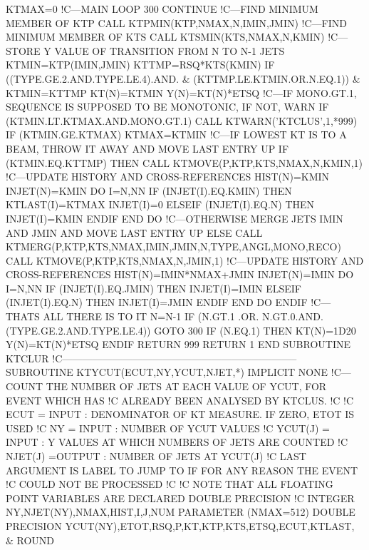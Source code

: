     KTMAX=0
!C---MAIN LOOP
300 CONTINUE
!C---FIND MINIMUM MEMBER OF KTP
    CALL KTPMIN(KTP,NMAX,N,IMIN,JMIN)
!C---FIND MINIMUM MEMBER OF KTS
    CALL KTSMIN(KTS,NMAX,N,KMIN)
!C---STORE Y VALUE OF TRANSITION FROM N TO N-1 JETS
    KTMIN=KTP(IMIN,JMIN)
    KTTMP=RSQ*KTS(KMIN)
    IF ((TYPE.GE.2.AND.TYPE.LE.4).AND. &
         (KTTMP.LE.KTMIN.OR.N.EQ.1)) &
         KTMIN=KTTMP
    KT(N)=KTMIN
    Y(N)=KT(N)*ETSQ
!C---IF MONO.GT.1, SEQUENCE IS SUPPOSED TO BE MONOTONIC, IF NOT, WARN
    IF (KTMIN.LT.KTMAX.AND.MONO.GT.1) CALL KTWARN('KTCLUS',1,*999)
    IF (KTMIN.GE.KTMAX) KTMAX=KTMIN
!C---IF LOWEST KT IS TO A BEAM, THROW IT AWAY AND MOVE LAST ENTRY UP
    IF (KTMIN.EQ.KTTMP) THEN
       CALL KTMOVE(P,KTP,KTS,NMAX,N,KMIN,1)
!C---UPDATE HISTORY AND CROSS-REFERENCES
       HIST(N)=KMIN
       INJET(N)=KMIN
       DO I=N,NN
          IF (INJET(I).EQ.KMIN) THEN
             KTLAST(I)=KTMAX
             INJET(I)=0
          ELSEIF (INJET(I).EQ.N) THEN
             INJET(I)=KMIN
          ENDIF
       END DO
!C---OTHERWISE MERGE JETS IMIN AND JMIN AND MOVE LAST ENTRY UP
    ELSE
       CALL KTMERG(P,KTP,KTS,NMAX,IMIN,JMIN,N,TYPE,ANGL,MONO,RECO)
       CALL KTMOVE(P,KTP,KTS,NMAX,N,JMIN,1)
!C---UPDATE HISTORY AND CROSS-REFERENCES
       HIST(N)=IMIN*NMAX+JMIN
       INJET(N)=IMIN
       DO I=N,NN
          IF (INJET(I).EQ.JMIN) THEN
             INJET(I)=IMIN
          ELSEIF (INJET(I).EQ.N) THEN
             INJET(I)=JMIN
          ENDIF
       END DO
    ENDIF
!C---THATS ALL THERE IS TO IT
    N=N-1
    IF (N.GT.1 .OR. N.GT.0.AND.(TYPE.GE.2.AND.TYPE.LE.4)) GOTO 300
    IF (N.EQ.1) THEN
       KT(N)=1D20
       Y(N)=KT(N)*ETSQ
    ENDIF
    RETURN
999 RETURN 1
  END SUBROUTINE KTCLUR
!C-----------------------------------------------------------------------
\nwendcode{}\plusendmoddef
      SUBROUTINE KTYCUT(ECUT,NY,YCUT,NJET,*)
      IMPLICIT NONE
!C---COUNT THE NUMBER OF JETS AT EACH VALUE OF YCUT, FOR EVENT WHICH HAS
!C   ALREADY BEEN ANALYSED BY KTCLUS.
!C
!C   ECUT    = INPUT : DENOMINATOR OF KT MEASURE. IF ZERO, ETOT IS USED
!C   NY      = INPUT : NUMBER OF YCUT VALUES
!C   YCUT(J) = INPUT : Y VALUES AT WHICH NUMBERS OF JETS ARE COUNTED
!C   NJET(J) =OUTPUT : NUMBER OF JETS AT YCUT(J)
!C   LAST ARGUMENT IS LABEL TO JUMP TO IF FOR ANY REASON THE EVENT
!C   COULD NOT BE PROCESSED
!C
!C   NOTE THAT ALL FLOATING POINT VARIABLES ARE DECLARED DOUBLE PRECISION
!C
      INTEGER NY,NJET(NY),NMAX,HIST,I,J,NUM
      PARAMETER (NMAX=512)
      DOUBLE PRECISION YCUT(NY),ETOT,RSQ,P,KT,KTP,KTS,ETSQ,ECUT,KTLAST, &
           ROUND
